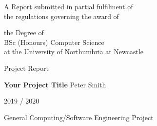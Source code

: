 
\begin{titlepage}
\Large
A Report submitted in partial fulfilment of\\
 the regulations governing the award of
\par
the Degree of\\[5mm]
{\huge	 BSc (Honours) Computer Science }\\[5mm]
at the University of Northumbria at Newcastle
\par
\vspace*{1in}
{\Large Project Report}
\par\vspace{1em}
{\Huge \bfseries Your Project Title}
\vfill
Peter Smith
\par\vspace{1em}
2019 / 2020
\par\vspace{1em}
General Computing/Software Engineering Project
\end{titlepage}
